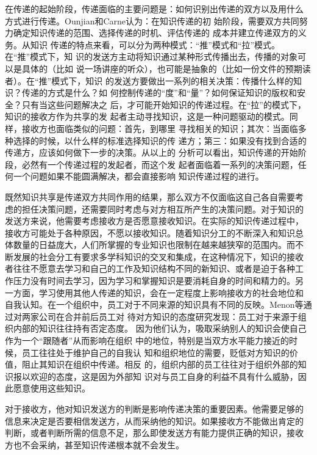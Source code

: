 \documentclass[12pt,a4paper]{ctexart}
\begin{document}
在传递的起始阶段，传递面临的主要问题是：如何识别出传递的双方以及用什么
方式进行传递。Ounjian和Carne\cite{ounjian1987sfa}认为：在知识传递的初
始阶段，需要双方共同努力确定知识传递的范围、选择传递的时机、评估传递的
成本并建立传递双方的义务。从知识
传递的特点来看，可以分为两种模式：“推”模式和“拉”模式。在“推”模式下，知
识的发送方主动将知识通过某种形式传播出去，传播的对象可以是具体的（比如
说一场讲座的听众），也可能是抽象的（比如一份文件的预期读者）。在“推”模式下，知识
的发送方要做出一系列的相关决策：传播什么样的知识？传递的方式是什么？如
何控制传递的“度”和“量”？如何保证知识的版权和安全？只有当这些问题解决之
后，才可能开始知识的传递过程。在“拉”的模式下，知识的接收方作为共享的发
起者主动寻找知识，这是一种问题驱动的模式。同样，接收方也面临类似的问题：首先，到哪里
寻找相关的知识；其次：当面临多种选择的时候，以什么样的标准选择知识的传
递方；第三：如果没有找到合适的传递方，应该如何做下一步的决策。从以上的
分析可以看出，知识传递的开始阶段，必然有一个传递过程的发起者，而这个发
起者面临着一系列的决策问题，任何一个问题如果不能圆满解决，都会直接影响
知识传递过程的进行。

既然知识共享是传递双方共同作用的结果，那么双方不仅面临这自己各自需要考
虑的担任决策问题，还需要同时考虑与对方相互所产生的决策问题。对于知识的
发送方来说，他需要考虑接收方是否愿意接收知识。在实际的知识传递过程中，
接收方可能处于各种原因，不愿以接收知识。随着知识分工的不断深入和知识总
体数量的日益庞大，人们所掌握的专业知识也限制在越来越狭窄的范围内。而不
断发展的社会分工有要求多学科知识的交叉和集成，在这种情况下，知识的接收
者往往不愿意去学习和自己的工作及知识结构不同的新知识、或者是迫于各种工
作压力没有时间去学习，因为学习和掌握知识是要消耗自身的时间和精力的。另
一方面，学习使用其他人传递的知识，会在一定程度上影响接收方的社会地位和
自我认知。在一个组织中，员工对于不同来源的知识具有不同的反映。Menon等\cite{2203456620060801}通过对两家公司在合并前后员工对
待对方知识的态度研究发现：员工对于来源于组织内部的知识往往持有否定态度。
因为他们认为，吸取采纳别人的知识会使自己作为一个“跟随者”从而影响在组织
中的地位，特别是当双方水平能力接近的时候，员工往往处于维护自己的自我认
知和组织地位的需要，贬低对方知识的价值，阻止其知识在组织中传递。相反
的，组织内部的员工往往对于组织外部的知识报以欢迎的态度，这是因为外部知
识对与员工自身的利益不具有什么威胁，因此愿意使用这些知识。

对于接收方，他对知识发送方的判断是影响传递决策的重要因素。他需要足够的
信息来决定是否要相信发送方，从而采纳他的知识。如果接收方不能做出肯定的
判断，或者判断所需的信息不足，那么即使发送方有能力提供正确的知识，接收
方也不会采纳，甚至知识传递根本就不会发生。
\end{document}

